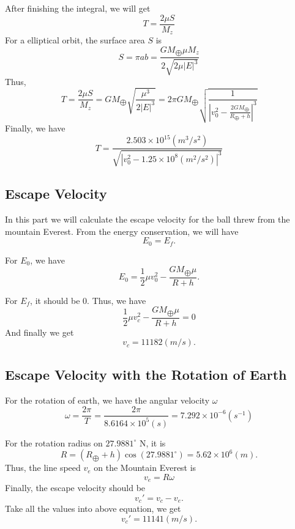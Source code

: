 \documentclass[%
 reprint,
 amsmath,amssymb,
 aps,
]{revtex4-1}
\begin{document}
After finishing the integral, we will get
\begin{equation*}
    T=\frac{2\mu S}{M_z}
\end{equation*}
For a elliptical orbit, the surface area $S$ is
\begin{equation*}
    S=\pi ab=\frac{GM_{\bigoplus}\mu M_z}{2\sqrt{2\mu|E|^3}}
\end{equation*}
Thus,
\begin{equation*}
    T=\frac{2\mu S}{M_z}=GM_{\bigoplus}\sqrt{\frac{\mu^3}{2|E|^3}}=2\pi GM_{\bigoplus}\sqrt{\frac{1}{| v_0^2-\frac{2GM_{\bigoplus}}{R_{\bigoplus}+h}|^3}}
\end{equation*}
Finally, we have
\begin{equation*}
    T=\frac{2.503\times10^{15}(m^3/s^2)}{\sqrt{|v_0^2-1.25\times10^{8}(m^2/s^2)|^3}}
\end{equation*}
\subsection{Escape Velocity}
In this part we will calculate the escape velocity for the ball threw from the mountain Everest. 
From the energy conservation, we will have
\begin{equation*}
    E_0=E_f.
\end{equation*}

For $E_0$, we have
\begin{equation*}
    E_0=\frac{1}{2}\mu v_0^2-\frac{GM_{\bigoplus}\mu}{R+h}.
\end{equation*}

For $E_f$, it should be $0$.
Thus, we have
\begin{equation*}
    \frac{1}{2}\mu v_c^2-\frac{GM_{\bigoplus}\mu}{R+h}=0
\end{equation*}
And finally we get
\begin{equation*}
    v_c=11182(m/s).
\end{equation*}
\subsection{Escape Velocity with the Rotation of Earth}
For the rotation of earth, we have the angular velocity $\omega$
\begin{equation*}
    \omega=\frac{2\pi}{T}=\frac{2\pi}{8.6164\times10^{5}(s)}=7.292\times10^{-6}(s^{-1})
\end{equation*}

For the rotation radius on $27.9881^{\circ}$ N, it is
\begin{equation*}
    R=(R_{\bigoplus}+h)\cos{(27.9881^{\circ})}=5.62\times10^{6}(m).
\end{equation*}
Thus, the line speed $v_e$ on the Mountain Everest is 
\begin{equation*}
   v_e=R\omega 
\end{equation*}
Finally, the escape velocity should be
\begin{equation*}
    v_c'=v_c-v_e.
\end{equation*}
Take all the values into above equation, we get
\begin{equation*}
    v_c'=11141(m/s).
\end{equation*}
\end{document}
